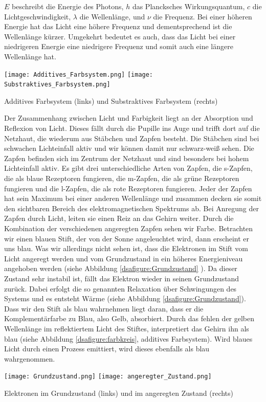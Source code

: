$E$ beschreibt die Energie des Photons, $h$ das Plancksches Wirkungsquantum, $c$ die Lichtgeschwindigkeit, $\lambda$ die Wellenlänge, und $\nu$ die Frequenz.
Bei einer höheren Energie hat das Licht eine höhere Frequenz und dementsprechend ist die Wellenlänge kürzer. Umgekehrt bedeutet es auch, dass das Licht bei einer niedrigeren Energie eine niedrigere Frequenz und somit auch eine längere Wellenlänge hat.

\begin{dsafigure}
 \centering
 \texttt{[image: Additives\_Farbsystem.png]}
  \hfill
 \texttt{[image: Substraktives\_Farbsystem.png]}
 \caption{Additives Farbsystem (links)\cite{Additives_Farbsystem} und Substraktives Farbsystem (rechts)\cite{Subtraktives_Farbsystem}}
 \label{dsafigure:farbkreis}
\end{dsafigure}


Der Zusammenhang zwischen Licht und Farbigkeit liegt an der Absorption und Reflexion von Licht. Dieses fällt durch die Pupille ins Auge und trifft dort auf die Netzhaut, die wiederum aus Stäbchen und Zapfen besteht. Die Stäbchen sind bei schwachen Lichteinfall aktiv und wir können damit nur schwarz-weiß sehen. Die Zapfen befinden sich im Zentrum der Netzhaut und sind besonders bei hohem Lichteinfall aktiv. Es gibt drei unterschiedliche Arten von Zapfen, die s-Zapfen, die als blaue Rezeptoren fungieren, die m-Zapfen, die als grüne Rezeptoren fungieren und die l-Zapfen, die als rote Rezeptoren fungieren. Jeder der Zapfen hat sein Maximum bei einer anderen Wellenlänge und zusammen decken sie somit den sichtbaren Bereich des elektromagnetischen Spektrums ab. 
Bei Anregung der Zapfen durch Licht, leiten sie einen Reiz an das Gehirn weiter. Durch die Kombination der verschiedenen angeregten Zapfen sehen wir Farbe.
Betrachten wir einen blauen Stift, der von der Sonne angeleuchtet wird, dann erscheint er uns blau. Was wir allerdings nicht sehen ist, dass die Elektronen im Stift vom Licht angeregt werden und vom Grundzustand in ein höheres Energieniveau angehoben werden (siehe Abbildung \ref{dsafigure:Grundzustand} ). Da dieser Zustand sehr instabil ist, fällt das Elektron wieder in seinen Grundzustand zurück. Dabei erfolgt die so genannten Relaxation über Schwingungen des Systems und es entsteht Wärme (siehe Abbildung \ref{dsafigure:Grundzustand}). Dass wir den Stift als blau wahrnehmen liegt daran, dass er die Komplementärfarbe zu Blau, also Gelb, absorbiert. Durch das fehlen der gelben Wellenlänge im reflektiertem Licht des Stiftes, interpretiert das Gehirn ihn als blau (siehe Abbildung \ref{dsafigure:farbkreis}, additives Farbsystem).
Wird blaues Licht durch einen Prozess emittiert, wird dieses ebenfalls als blau wahrgenommen.


\begin{dsafigure}
 \centering
 \texttt{[image: Grundzustand.png]}
   \hfill
   \texttt{[image: angeregter\_Zustand.png]}
 \caption{Elektronen im Grundzustand (links) und im angeregten Zustand (rechts)}
 \label{dsafigure:Grundzustand}
\end{dsafigure}

